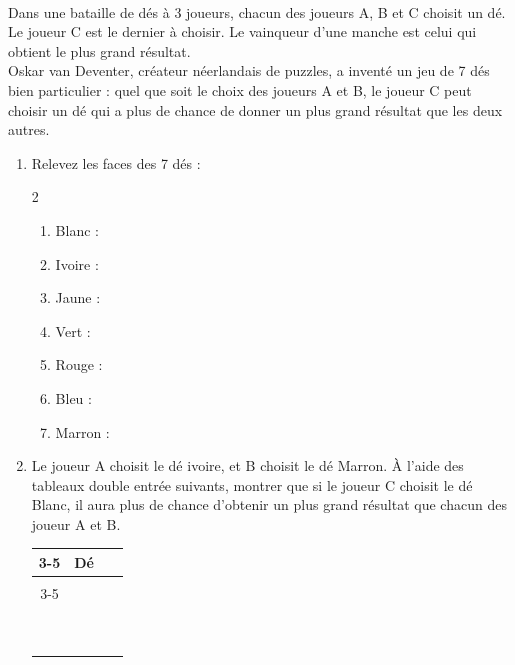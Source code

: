 \documentclass[main.tex]{subfiles}
\begin{document}
\begin{exercise}\hfill \\
Dans une bataille de dés à 3 joueurs, chacun des joueurs A, B et C choisit un dé. Le joueur C est le dernier à choisir. Le vainqueur d'une manche est celui qui obtient le plus grand résultat.\\
Oskar van Deventer, créateur néerlandais de puzzles, a inventé un jeu de 7 dés bien particulier : quel que soit le choix des joueurs A et B, le joueur C peut choisir un dé qui a plus de chance de donner un plus grand résultat que les deux autres. 
	\begin{enumerate}[label=\arabic*),leftmargin=*]
		\item  Relevez les faces des 7 dés :
		\vspace{-1em}
		\begin{multicols}{2}
			\begin{enumerate}[label=\textbullet,leftmargin=*]
					\item \rule{0pt}{1.8em}Blanc : 
					\item \rule{0pt}{1.8em}Ivoire :
					\item \rule{0pt}{1.8em}Jaune :
					\item \rule{0pt}{1.8em}Vert :
					\item \rule{0pt}{1.8em}Rouge :
					\item \rule{0pt}{1.8em}Bleu :
					\item \rule{0pt}{1.8em}Marron :
				\end{enumerate}
		\end{multicols}
	\vspace{-0.5em}
		\item  Le joueur A choisit le dé ivoire, et B choisit le dé Marron. À l'aide des tableaux double entrée suivants,   montrer que si le joueur C choisit le dé Blanc, il aura plus de chance d'obtenir un plus grand résultat que chacun des joueur A et B.\\
  \noindent\parbox{0.30\linewidth}{
	\noindent\begin{tabular}{|*5{c|}}
		\cline{3-5}
		\multicolumn{2}{c|}{\multirow{2}{*}{}} & \multicolumn{3}{l|}{Dé  }  \\ \cline{3-5}
		\multicolumn{2}{c|}{}   &  \rule{0pt}{1.em}\rule{0.8em}{0pt} &  \rule{0pt}{1.em} \rule{0.8em}{0pt} &\rule{0pt}{1.em}\rule{0.9em}{0pt}    \\ \hline
		\multirow{3}{*}{\rotatebox[origin=c]{90}{Dé \qquad}}	  
		& \rule{0pt}{1.0em}\rule{1.em}{0pt}   &    &   &   \\ \cline{2-5}
		& \rule{0pt}{1.0em}  &   &    &   \\ \cline{2-5} 
		& \rule{0pt}{1.0em}  &   &   &     \\ \hline
	\end{tabular}
	
}
\end{enumerate}
\end{exercise}
\end{document}
